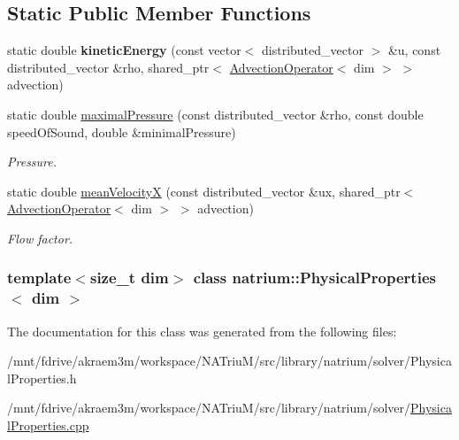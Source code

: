 \subsection*{Static Public Member Functions}
\begin{DoxyCompactItemize}
\item 
\hypertarget{classnatrium_1_1PhysicalProperties_ab813391c2437bca3edd626aac09a449f}{
static double {\bfseries kineticEnergy} (const vector$<$ distributed\_\-vector $>$ \&u, const distributed\_\-vector \&rho, shared\_\-ptr$<$ \hyperlink{classnatrium_1_1AdvectionOperator}{AdvectionOperator}$<$ dim $>$ $>$ advection)}
\label{classnatrium_1_1PhysicalProperties_ab813391c2437bca3edd626aac09a449f}

\item 
\hypertarget{classnatrium_1_1PhysicalProperties_a9041e6fc4bebe07da63c6f0b25aabc0d}{
static double \hyperlink{classnatrium_1_1PhysicalProperties_a9041e6fc4bebe07da63c6f0b25aabc0d}{maximalPressure} (const distributed\_\-vector \&rho, const double speedOfSound, double \&minimalPressure)}
\label{classnatrium_1_1PhysicalProperties_a9041e6fc4bebe07da63c6f0b25aabc0d}

\begin{DoxyCompactList}\small\item\em Pressure. \item\end{DoxyCompactList}\item 
\hypertarget{classnatrium_1_1PhysicalProperties_a34720f497e9659794dfe8e0ca2554f3a}{
static double \hyperlink{classnatrium_1_1PhysicalProperties_a34720f497e9659794dfe8e0ca2554f3a}{meanVelocityX} (const distributed\_\-vector \&ux, shared\_\-ptr$<$ \hyperlink{classnatrium_1_1AdvectionOperator}{AdvectionOperator}$<$ dim $>$ $>$ advection)}
\label{classnatrium_1_1PhysicalProperties_a34720f497e9659794dfe8e0ca2554f3a}

\begin{DoxyCompactList}\small\item\em Flow factor. \item\end{DoxyCompactList}\end{DoxyCompactItemize}
\subsubsection*{template$<$size\_\-t dim$>$ class natrium::PhysicalProperties$<$ dim $>$}



The documentation for this class was generated from the following files:\begin{DoxyCompactItemize}
\item 
/mnt/fdrive/akraem3m/workspace/NATriuM/src/library/natrium/solver/PhysicalProperties.h\item 
/mnt/fdrive/akraem3m/workspace/NATriuM/src/library/natrium/solver/\hyperlink{PhysicalProperties_8cpp}{PhysicalProperties.cpp}\end{DoxyCompactItemize}
